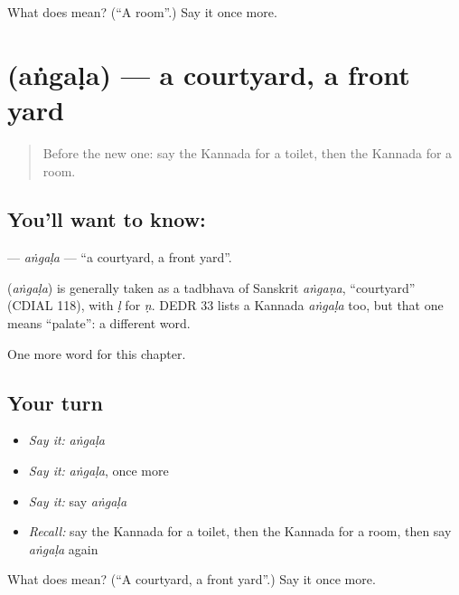 \begin{tcolorbox}[breakable,colback=teal!4,colframe=teal!35!black,title={Before you move on}]
What does  mean? (\textquotedblleft{}A room\textquotedblright{}.) Say it once more.
\end{tcolorbox}
\section[\texorpdfstring{\kn{ಅಂಗಳ} (aṅgaḷa)}{ಅಂಗಳ (aṅgaḷa)}]{ (aṅgaḷa) — a courtyard, a front yard}

\label{lesson:KA-C173-angala}



\begin{quote}
Before the new one: say the Kannada for a toilet, then the Kannada for a room.
\end{quote}

\subsection*{You'll want to know: }
\textbf{} — \emph{aṅgaḷa} — \textquotedblleft{}a courtyard, a front yard\textquotedblright{}.

\begin{cousinweb}
\textbf{} (\emph{aṅgaḷa}) is generally taken as a tadbhava of Sanskrit \emph{aṅgaṇa}, \textquotedblleft{}courtyard\textquotedblright{} (CDIAL 118), with \emph{ḷ} for \emph{ṇ}. DEDR 33 lists a Kannada \emph{aṅgaḷa} too, but that one means \textquotedblleft{}palate\textquotedblright{}: a different word.
\end{cousinweb}

\begin{grammarlens}[title={What you've built}]
One more word for this chapter.
\end{grammarlens}

\subsection*{Your turn}
\begin{itemize}
\raggedright
  \item \emph{Say it:} \emph{aṅgaḷa}
  \item \emph{Say it:} \emph{aṅgaḷa}, once more
  \item \emph{Say it:} say \emph{aṅgaḷa}
  \item \emph{Recall:} say the Kannada for a toilet, then the Kannada for a room, then say \emph{aṅgaḷa} again
\end{itemize}

\begin{tcolorbox}[breakable,colback=teal!4,colframe=teal!35!black,title={Before you move on}]
What does  mean? (\textquotedblleft{}A courtyard, a front yard\textquotedblright{}.) Say it once more.
\end{tcolorbox}
